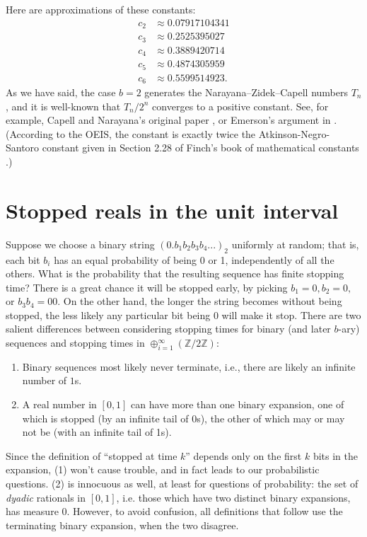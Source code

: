 \documentclass[12pt]{amsart}
\newcommand{\Z}{\mathbb{Z}}
\theoremstyle{definition}
\begin{document}
Here are approximations of these constants:
\begin{align*}
    c_2 &\approx 0.07917104341 \\
    c_3 &\approx 0.2525395027 \\
    c_4 &\approx 0.3889420714 \\
    c_5 &\approx 0.4874305959 \\
    c_6 &\approx 0.5599514923.
\end{align*}
As we have said, the case $b = 2$ generates the Narayana--Zidek--Capell numbers
$T_n$, and it is well-known that $T_n / 2^n$ converges to a positive constant.
See, for example, Capell and Narayana's original paper \cite{capell1970knock},
or Emerson's argument in \cite{emerson2006family}. (According to the OEIS, the
constant is exactly twice the Atkinson-Negro-Santoro constant given in Section
2.28 of Finch's book of mathematical constants \cite{finch2003mathematical}.)

\section{Stopped reals in the unit interval}
\label{sec:reals}

Suppose we choose a binary string $(0.b_1 b_2 b_3 b_4 ...)_2$ uniformly at
random; that is, each bit $b_i$ has an equal probability of being 0 or 1,
independently of all the others.  What is the probability that the resulting
sequence has finite stopping time? There is a great chance it will be stopped
early, by picking $b_1=0, b_2=0,$ or $b_3 b_4 = 00.$ On the other hand, the
longer the string becomes without being stopped, the less likely any particular
bit being $0$ will make it stop. There are two salient differences between
considering stopping times for binary (and later $b$-ary) sequences and
stopping times in $\oplus_{i=1}^\infty (\Z/2\Z)$:
\begin{enumerate}
    \item Binary sequences most likely never terminate, i.e., there are likely
        an infinite number of $1$s.
    \item A real number in $[0,1]$ can have more than one binary expansion,
        one of which is stopped (by an infinite tail of 0s), the other of which
        may or may not be (with an infinite tail of 1s).
\end{enumerate}
Since the definition of ``stopped at time $k$'' depends only on the first $k$ bits in the expansion,
(1) won't cause trouble, and in fact leads to our probabilistic questions.
(2) is innocuous as well, at least for questions of probability: the set of \emph{dyadic} rationals
in $[0,1]$, i.e. those which have two distinct binary expansions, has measure 0.
However, to avoid confusion, all definitions that follow use the terminating binary expansion, when the two disagree.
\end{document}
